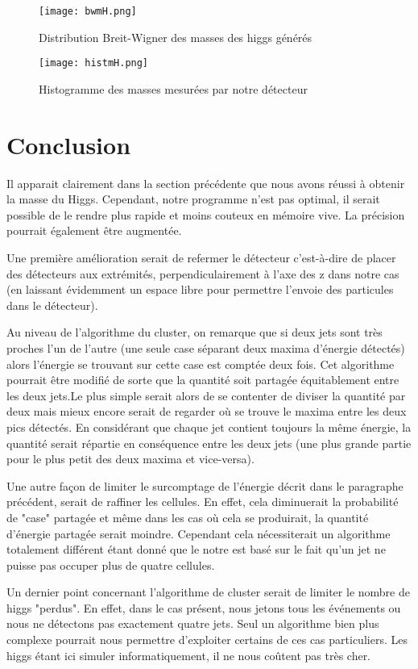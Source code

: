\documentclass[11pt]{article}
\begin{document}
\begin{figure}
\caption{Distribution Breit-Wigner des masses des higgs générés}
\texttt{[image: bwmH.png]}
\label{bw}
\end{figure}

\begin{figure}
\caption{Histogramme des masses mesurées par notre détecteur}
\texttt{[image: histmH.png]}
\label{hist}
\end{figure}


\newpage
\section{Conclusion}
 Il apparait clairement dans la section pr\'ec\'edente que nous avons r\'eussi \`a obtenir la masse du Higgs.
Cependant, notre programme n'est pas optimal, il serait possible de le rendre plus rapide et 
moins couteux en m\'emoire vive. La pr\'ecision pourrait \'egalement être augment\'ee. 

Une première amélioration serait de refermer le d\'etecteur c'est-à-dire de placer des d\'etecteurs aux extrémités, 
perpendiculairement à l'axe des z dans notre cas (en laissant évidemment un espace libre pour permettre l'envoie des 
particules dans le d\'etecteur). 

Au niveau de l'algorithme du cluster, on remarque que si deux jets sont très proches l'un de l'autre (une seule case 
s\'eparant deux maxima d'énergie détectés) alors l'énergie se trouvant sur cette
case est comptée deux fois. Cet algorithme
 pourrait être modifié de sorte que la quantité soit partagée équitablement
entre les deux jets.Le plus simple serait
alors de se contenter de diviser la quantité par deux mais mieux encore serait de regarder où se trouve le 
maxima entre les deux pics détectés. En considérant que chaque jet contient toujours la même énergie, la quantité serait
répartie en conséquence entre les deux jets (une plus grande partie pour le plus
petit des deux maxima et vice-versa). 

Une autre façon de limiter le surcomptage de l'énergie décrit dans le paragraphe précédent, serait de raffiner les 
cellules. En effet, cela diminuerait la probabilité de "case" partagée et même dans les cas où cela se produirait, la
quantité d'énergie partagée serait moindre. Cependant cela nécessiterait un
algorithme totalement différent
étant donné que le notre est basé sur le fait qu'un jet ne puisse pas occuper
plus de quatre cellules.

Un dernier point concernant l'algorithme de cluster serait de limiter le nombre
de higgs "perdus". En effet, dans le cas présent, nous jetons tous les
événements ou nous ne détectons pas exactement quatre jets. Seul un algorithme
bien plus complexe pourrait nous permettre d'exploiter certains de ces cas
particuliers. Les higgs étant ici simuler informatiquement, il ne nous coûtent
pas très cher.
\end{document}
